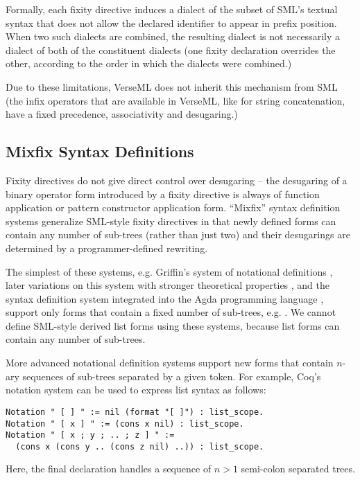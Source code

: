 
Formally, each fixity directive induces a dialect of the subset of SML's textual syntax that does not allow the declared identifier to appear in prefix position. When two such dialects are combined, the resulting dialect is not necessarily a dialect of both of the constituent dialects (one fixity declaration overrides the other, according to the order in which the dialects were combined.)

Due to these limitations, VerseML does not inherit this mechanism from SML (the infix operators that are available in VerseML, like \li{^} for string concatenation, have a fixed precedence, associativity and desugaring.)

\subsection{Mixfix Syntax Definitions}\label{sec:mixfix}
Fixity directives do not give direct control over desugaring -- the  desugaring of a binary operator form introduced by a fixity directive is always of function application or pattern constructor application form. ``Mixfix'' syntax definition systems generalize SML-style fixity directives in that newly defined forms can contain any number of sub-trees (rather than just two) and their desugarings are determined by a programmer-defined rewriting. 

The simplest of these systems, e.g. Griffin's system of notational definitions \cite{5134}, later variations on this system with stronger theoretical properties \cite{DBLP:conf/gpce/TahaJ03}, and the syntax definition system integrated into the Agda programming language \cite{DBLP:conf/ifl/DanielssonN08}, support only forms that contain a fixed number of sub-trees, e.g. . We cannot define SML-style derived list forms using these systems, because list forms can contain any number of sub-trees.

More advanced notational definition systems support new forms that contain $n$-ary sequences of sub-trees separated by a given token. For example, Coq's notation system \cite{Coq:manual} can be used to express list syntax as follows:
\begin{lstlisting}[numbers=none]
Notation " [ ] " := nil (format "[ ]") : list_scope.
Notation " [ x ] " := (cons x nil) : list_scope.
Notation " [ x ; y ; .. ; z ] " := 
  (cons x (cons y .. (cons z nil) ..)) : list_scope.
\end{lstlisting}
Here, the final declaration handles a sequence of $n > 1$ semi-colon separated trees.

